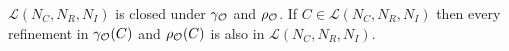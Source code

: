 \documentclass[
]{ceurart}
\begin{document}

\begin{lemma}
$\mathcal{L}(N_C, N_R, N_I)$ is closed under $\gamma_{\mathcal{O}}$ and $\rho_{\mathcal{O}}$.
%
If $C \in \mathcal{L}(N_C, N_R, N_I)$ then every refinement in $\gamma_{\mathcal{O}}(C)$ and $\rho_{\mathcal{O}}(C)$ is also in $\mathcal{L}(N_C, N_R, N_I)$.
\end{lemma}

\end{document}
